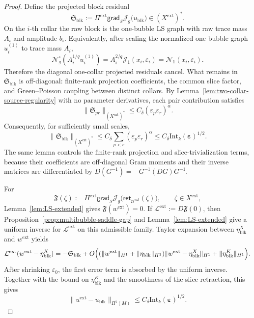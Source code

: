 \documentclass[11pt,reqno,a4paper]{amsart}
\numberwithin{equation}{section}
\theoremstyle{plain}
\theoremstyle{remark}
\theoremstyle{plain}
\begin{document}
\begin{proof}
Define the projected block residual
\[
\mathfrak S_{\mathrm{blk}}
:=
\Pi^{\mathrm{ext}}\mathsf{grad}_{\mathcal S}\mathcal J_g
\bigl(u_{\mathrm{blk}}\bigr)
\in (X^{\mathrm{ext}})^* .
\]
On the $i$-th collar the raw block is the one-bubble LS graph with raw trace mass
$A_i$ and amplitude $b_i$.  Equivalently, after scaling the normalized one-bubble graph
$u_i^{(1)}$ to trace mass $A_i$,
\[
\mathcal N_g^\circ(A_i^{1/q}u_i^{(1)})
=
A_i^{2/q}\mathcal J_1(x_i,\varepsilon_i)
=
\mathcal N_1(x_i,\varepsilon_i).
\]
Therefore the diagonal one-collar projected residuals cancel.  What remains in
$\mathfrak S_{\mathrm{blk}}$ is off-diagonal: finite-rank projection coefficients, the common slice factor,
and Green--Poisson coupling between distinct collars.  By Lemma~\ref{lem:two-collar-source-regularity} with no
parameter derivatives, each pair contribution satisfies
\[
\|\mathfrak S_{pr}\|_{(X^{\mathrm{ext}})^*}
\le C_\delta(\varepsilon_p\varepsilon_r)^\alpha .
\]
Consequently, for sufficiently small scales,
\[
\|\mathfrak S_{\mathrm{blk}}\|_{(X^{\mathrm{ext}})^*}
\le
C_\delta\sum_{p<r}(\varepsilon_p\varepsilon_r)^\alpha
\le
C_\delta\mathrm{Int}_k(\boldsymbol\varepsilon)^{1/2}.
\]
The same lemma controls the finite-rank projection and slice-trivialization terms, because their coefficients
are off-diagonal Gram moments and their inverse matrices are differentiated by
$D(G^{-1})=-G^{-1}(DG)G^{-1}$.


For
\[
\mathfrak F(\zeta)
:=
\Pi^{\mathrm{ext}}\mathsf{grad}_{\mathcal S}\mathcal J_g
\bigl(\mathsf{ret}_{\mathcal U^{\mathrm{ext}}}(\zeta)\bigr),
\qquad
\zeta\in X^{\mathrm{ext}},
\]
Lemma~\ref{lem:LS-extended} gives $\mathfrak F(w^{\mathrm{ext}})=0$.  If
$\mathcal L^{\mathrm{ext}}:=D\mathfrak F(0)$, then
Proposition~\ref{prop:multibubble-saddle-gap} and Lemma~\ref{lem:LS-extended} give a
uniform inverse for $\mathcal L^{\mathrm{ext}}$ on this admissible family.  Taylor
expansion between $\eta_{\mathrm{blk}}^X$ and $w^{\mathrm{ext}}$ yields
\[
\mathcal L^{\mathrm{ext}}(w^{\mathrm{ext}}-\eta_{\mathrm{blk}}^X)
=
-\mathfrak S_{\mathrm{blk}}
+
O\Bigl(
(\|w^{\mathrm{ext}}\|_{H^1}+\|\eta_{\mathrm{blk}}\|_{H^1})
\|w^{\mathrm{ext}}-\eta_{\mathrm{blk}}^X\|_{H^1}
+
\|\eta_{\mathrm{blk}}^K\|_{H^1}
\Bigr).
\]
After shrinking $\varepsilon_0$, the first error term is absorbed by the uniform inverse.
Together with the bound on $\eta_{\mathrm{blk}}^K$ and the smoothness of the slice
retraction, this gives
\[
\|u^{\mathrm{ext}}-u_{\mathrm{blk}}\|_{H^1(M)}
\le
C_\delta \mathrm{Int}_k(\boldsymbol\varepsilon)^{1/2}.
\]


\end{proof}
\end{document}
